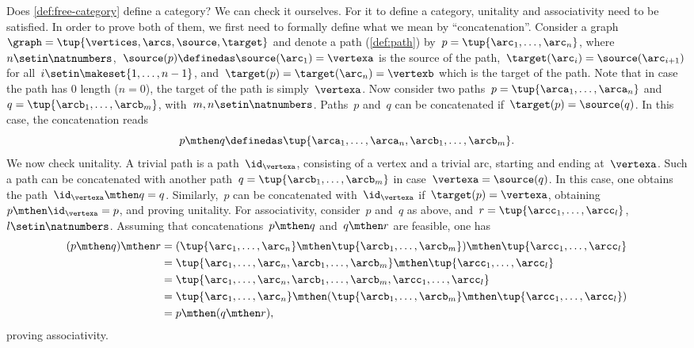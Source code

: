 Does \cref{def:free-category} define a category?
We can check it ourselves.
For it to define a category, unitality and associativity need to be satisfied.
In order to prove both of them, we first need to formally define what we mean by ``concatenation''.
Consider a graph~$\graph=\tup{\vertices,\arcs,\source,\target}$ and denote a path (\cref{def:path}) by~$p=\tup{\arc_1,\ldots, \arc_n}$, where~$n\setin \natnumbers$,~$\source(p)\definedas\source(\arc_1)=\vertexa$ is the source of the path,~$\target(\arc_i)=\source(\arc_{i+1})$ for all~$i\setin \makeset{1,\ldots,n-1}$, and~$\target(p)=\target(\arc_n)=\vertexb$ which is the target of the path.
Note that in case the path has 0 length ($n=0$), the target of the path is simply~$\vertexa$.
Now consider two paths~$p=\tup{\arca_1,\ldots,\arca_n}$ and~$q=\tup{\arcb_1,\ldots,\arcb_m}$, with~$m,n\setin \natnumbers$.
Paths~$p$ and~$q$ can be concatenated if~$\target(p)=\source(q)$.
In this case, the concatenation reads
%
\begin{equation}
    p\mthen q\definedas \tup{\arca_1,\ldots, \arca_n,\arcb_1,\ldots,\arcb_m}.
\end{equation}
%
We now check unitality.
A trivial path is a path~$\id_\vertexa$, consisting of a vertex and a trivial arc, starting and ending at~$\vertexa$.
Such a path can be concatenated with another path~$q=\tup{\arcb_1,\ldots,\arcb_m}$ in case~$\vertexa=\source(q)$.
In this case, one obtains the path~$\id_\vertexa \mthen q=q$.
Similarly,~$p$ can be concatenated with~$\id_\vertexa$ if~$\target(p)=\vertexa$, obtaining~$p\mthen \id_\vertexa=p$, and proving unitality.
For associativity, consider~$p$ and~$q$ as above, and~$r=\tup{\arcc_1,\ldots,\arcc_l}$,~$l\setin \natnumbers$.
Assuming that concatenations~$p\mthen q$ and~$q\mthen r$ are feasible, one has
\begin{equation}
    \begin{aligned}
        (p\mthen q)
        \mthen r & =(\tup{\arc_1,\ldots, \arc_n}\mthen \tup{\arcb_1,\ldots,\arcb_m})\mthen \tup{\arcc_1,\ldots,\arcc_l} \\
                 & =\tup{\arc_1,\ldots, \arc_n,\arcb_1,\ldots,\arcb_m}\mthen \tup{\arcc_1,\ldots,\arcc_l} \\
                 & = \tup{\arc_1,\ldots, \arc_n,\arcb_1,\ldots,\arcb_m, \arcc_1,\ldots,\arcc_l} \\
                 & =\tup{\arc_1,\ldots, \arc_n} \mthen (\tup{\arcb_1,\ldots,\arcb_m}\mthen \tup{\arcc_1,\ldots,\arcc_l}) \\
                 & =p\mthen (q\mthen r),
    \end{aligned}
\end{equation}
proving associativity.


